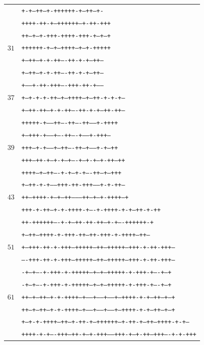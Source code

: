 \documentclass[10pt]{article}
\begin{document}
\begin{center}
\begin{tabular}{rl}
&\texttt{+-+---++--+-++++++-+--++---+-}\\
&\texttt{++++-++-+---++++++---+-++-+++}\\
&\texttt{++--+--+-+++-++++-+++-+--+--+}\\
\hline
$31$&\texttt{++++++-+--+---++++---+--+-+++++}\\
&\texttt{+--++---+-+-++----++-+-+---++--}\\
&\texttt{+--++---+-+-++----++-+-+---++--}\\
&\texttt{+-----+-++-+++----+++-++-+-----}\\
\hline
$37$&\texttt{+--+-+-+-++---+--++++--+---++-+-+-+--}\\
&\texttt{+---++-++--+-+-++----++-+-+--++-++---}\\
&\texttt{+++++-+-----++----++----++-----+-++++}\\
&\texttt{+--+++-+-----+----++----+-----+-+++--}\\
\hline
$39$&\texttt{+++--+-+-----+--++----++--+-----+-+--++}\\
&\texttt{+++--++-+---+-+--+----+--+-+---+-++--++}\\
&\texttt{++++---+--++----+-+--+-+----++--+---+++}\\
&\texttt{+---++-+-+-----+++-++-+++-----+-+-++---}\\
\hline
$43$&\texttt{++---++++-+--+--++--------++--+--+-++++---+}\\
&\texttt{+++-+-++--+-+-++++-+----+-++++-+-+--++-+-++}\\
&\texttt{++-++++++----+-+--++-++-++--+-+----++++++-+}\\
&\texttt{+---++--++++-+-+++-++--++-+++-+-++++--++---}\\
\hline
$51$&\texttt{+---+++-++-+-+++--+++++--++--+++++--+++-+-++-+++---}\\
&\texttt{----+++-++-+-+++--+++++--++--+++++--+++-+-++-+++---}\\
&\texttt{-+--+----+-+++-+-+++++--+--+--+++++-+-+++-+----+--+}\\
&\texttt{-+--+----+-+++-+-+++++--+--+--+++++-+-+++-+----+--+}\\
\hline
$61$&\texttt{++--+--++--+-+-++++--+-----+------+-----+--++++-+-+--++--+--+}\\
&\texttt{++--+--++--+-+-++++--+-----+------+-----+--++++-+-+--++--+--+}\\
&\texttt{+---+-+-++++---++--+-++-+---++++++---+-++-+--++---++++-+-+---}\\
&\texttt{++++-+-+----+++--++-+--+-+++------+++-+--+-++--+++----+-+-+++}\\
\hline
\end{tabular}\end{center}
\end{document}
